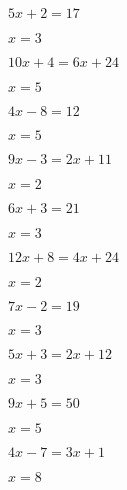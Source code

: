\documentclass{ximera}
\begin{document}
\begin{exercise}
\begin{xmmulticols}
    \begin{question} \( 5x + 2  = 17       \) \begin{oplossing} \( x = 3   \) \end{oplossing} \end{question}
    \begin{question} \( 10x + 4 = 6x + 24  \) \begin{oplossing} \( x = 5   \) \end{oplossing} \end{question}
    \begin{question} \( 4x - 8  = 12       \) \begin{oplossing} \( x = 5   \) \end{oplossing} \end{question}
    \begin{question} \( 9x - 3  = 2x + 11  \) \begin{oplossing} \( x = 2   \) \end{oplossing} \end{question}
    \begin{question} \( 6x + 3  = 21       \) \begin{oplossing} \( x = 3   \) \end{oplossing} \end{question}
    \begin{question} \( 12x + 8 = 4x + 24  \) \begin{oplossing} \( x = 2   \) \end{oplossing} \end{question}
    \begin{question} \( 7x - 2  = 19       \) \begin{oplossing} \( x = 3   \) \end{oplossing} \end{question}
    \begin{question} \( 5x + 3  = 2x + 12  \) \begin{oplossing} \( x = 3   \) \end{oplossing} \end{question}
    \begin{question} \( 9x + 5  = 50       \) \begin{oplossing} \( x = 5   \) \end{oplossing} \end{question}
    \begin{question} \( 4x - 7  = 3x + 1   \) \begin{oplossing} \( x = 8   \) \end{oplossing} \end{question}

\end{xmmulticols}
\end{exercise}
\end{document}
